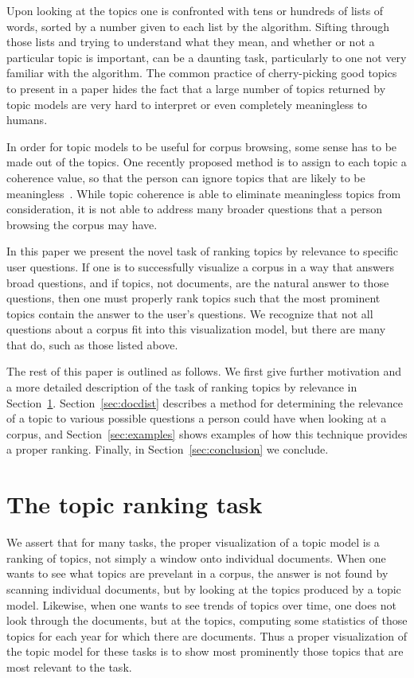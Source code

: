 \documentclass{article}
\newcommand{\secref}[1]{Section~\ref{sec:#1}}
\begin{document}
Upon looking at the topics one is confronted with tens or hundreds of lists of
words, sorted by a number given to each list by the algorithm.  Sifting through
those lists and trying to understand what they mean, and whether or not a
particular topic is important, can be a daunting task, particularly to one not
very familiar with the algorithm.  The common practice of cherry-picking good
topics to present in a paper hides the fact that a large number of topics
returned by topic models are very hard to interpret or even completely
meaningless to humans.

In order for topic models to be useful for corpus browsing, some sense has to
be made out of the topics.  One recently proposed method is to assign to each
topic a coherence value, so that the person can ignore topics that are likely
to be meaningless~\cite{newman-2010-automatic-evaluation-of-topic-coherence}.
While topic coherence is able to eliminate meaningless topics from
consideration, it is not able to address many broader questions that a person
browsing the corpus may have.

In this paper we present the novel task of ranking topics by relevance to
specific user questions.  If one is to successfully visualize a corpus in a way
that answers broad questions, and if topics, not documents, are the natural
answer to those questions, then one must properly rank topics such that the
most prominent topics contain the answer to the user's questions.  We recognize
that not all questions about a corpus fit into this visualization model, but
there are many that do, such as those listed above.

The rest of this paper is outlined as follows.  We first give further
motivation and a more detailed description of the task of ranking topics by
relevance in \secref{ranking}.  \secref{docdist} describes a method for
determining the relevance of a topic to various possible questions a person
could have when looking at a corpus, and \secref{examples} shows examples of
how this technique provides a proper ranking.  Finally, in \secref{conclusion}
we conclude.

\section{The topic ranking task}
\label{sec:ranking}

We assert that for many tasks, the proper visualization of a topic model is a
ranking of topics, not simply a window onto individual documents.  When one
wants to see what topics are prevelant in a corpus, the answer is not found by
scanning individual documents, but by looking at the topics produced by a topic
model.  Likewise, when one wants to see trends of topics over time, one does
not look through the documents, but at the topics, computing some statistics of
those topics for each year for which there are documents.  Thus a proper
visualization of the topic model for these tasks is to show most prominently
those topics that are most relevant to the task.
\end{document}
